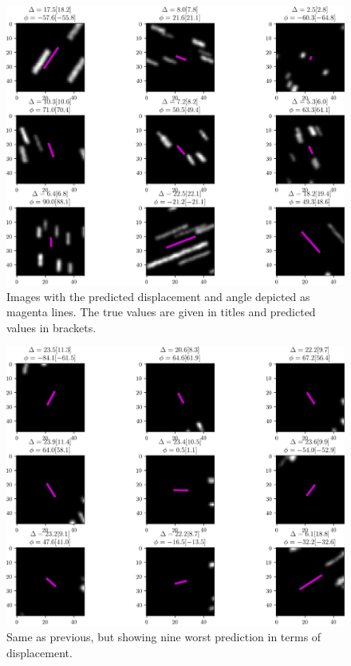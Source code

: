\documentclass{svjour3}                     %
\begin{document}
\begin{figure}
\includegraphics[width=\textwidth]{figs/figure3.png}
\caption{Images with the predicted displacement and angle depicted as magenta lines. The true values are given in titles and predicted values in brackets.}
\label{fig:fig4}
\end{figure}

\begin{figure}
\includegraphics[width=\textwidth]{figs/figure4.png}
\caption{Same as previous, but showing nine worst prediction in terms of displacement.}
\label{fig:fig5}
\end{figure}
\end{document}
